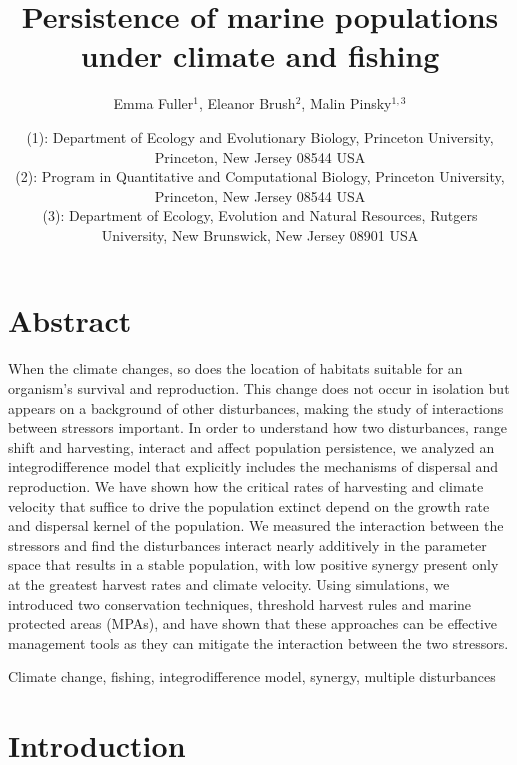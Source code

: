 \documentclass[12pt,english]{article}
\title{Persistence of marine populations under climate and fishing}
\author{Emma Fuller$^1$, Eleanor Brush$^2$, Malin Pinsky$^{1,3}$}
\date{\small (1): Department of Ecology and Evolutionary Biology, Princeton University, Princeton, New Jersey 08544 USA \\
(2): Program in Quantitative and Computational Biology, Princeton University, Princeton, New Jersey 08544 USA \\
(3): Department of Ecology, Evolution and Natural Resources, Rutgers University, New Brunswick, New Jersey 08901 USA}
\begin{document}
\maketitle
\pagebreak
\begin{spacing}{1.9}
\begin{flushleft}

\section{Abstract}

When the climate changes, so does the location of habitats suitable for an organism's survival and reproduction. This change does not occur in isolation but appears on a background of other disturbances, making the study of interactions between stressors important. In order to understand how two disturbances, range shift and harvesting, interact and affect population persistence, we analyzed an integrodifference model that explicitly includes the mechanisms of dispersal and reproduction. We have shown how the critical rates of harvesting and climate velocity that suffice to drive the population extinct depend on the growth rate and dispersal kernel of the population.  We measured the interaction between the stressors and find the disturbances interact nearly additively in the parameter space that results in a stable population, with low positive synergy present only at the greatest harvest rates and climate velocity.  Using simulations, we introduced two conservation techniques, threshold harvest rules and marine protected areas (MPAs), and have shown that these approaches can be effective management tools as they can mitigate the interaction between the two stressors.  

\hspace{10cm}

 Climate change, fishing, integrodifference model, synergy, multiple disturbances

\section{Introduction}


\end{flushleft}
\end{spacing}
\end{document}
